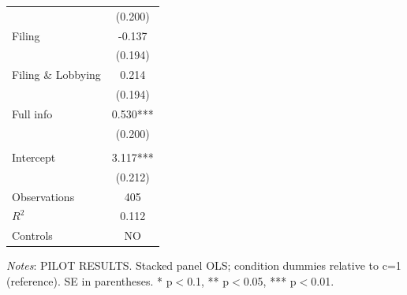\documentclass[11pt]{article}
\begin{document}
\begin{table}[!htbp]
\begin{threeparttable}
\begin{tabular}{l|c}
 & (0.200) \\
Filing & -0.137 \\
 & (0.194) \\
Filing \& Lobbying & 0.214 \\
 & (0.194) \\
Full info & 0.530*** \\
 & (0.200) \\
\\[0.5em]
Intercept & 3.117*** \\
 & (0.212) \\
\midrule
Observations & 405 \\
$R^2$ & 0.112 \\
Controls & NO \\
\bottomrule
\end{tabular}
\begin{tablenotes}[flushleft]
\footnotesize
\item \textit{Notes}: PILOT RESULTS. Stacked panel OLS; condition dummies relative to c=1 (reference). SE in parentheses. * p$<$0.1, ** p$<$0.05, *** p$<$0.01.
\end{tablenotes}
\end{threeparttable}
\end{table}
\end{document}
